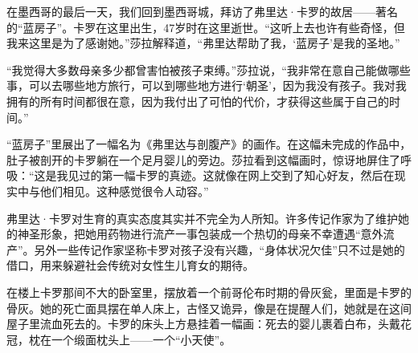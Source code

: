 \documentclass[12pt,oneside]{book}
\begin{document}
\begin{bookref}[frametitle={\cite{好好告别}}]
在墨西哥的最后一天，我们回到墨西哥城，拜访了弗里达·卡罗的故居——著名的“蓝房子”。卡罗在这里出生，47岁时在这里逝世。“这听上去也许有些奇怪，但我来这里是为了感谢她。”莎拉解释道，“弗里达帮助了我，‘蓝房子’是我的圣地。”

“我觉得大多数母亲多少都曾害怕被孩子束缚。”莎拉说，“我非常在意自己能做哪些事，可以去哪些地方旅行，可以到哪些地方进行‘朝圣’，因为我没有孩子。我对我拥有的所有时间都很在意，因为我付出了可怕的代价，才获得这些属于自己的时间。”

“蓝房子”里展出了一幅名为《弗里达与剖腹产》的画作。在这幅未完成的作品中，肚子被剖开的卡罗躺在一个足月婴儿的旁边。莎拉看到这幅画时，惊讶地屏住了呼吸：“这是我见过的第一幅卡罗的真迹。这就像在网上交到了知心好友，然后在现实中与他们相见。这种感觉很令人动容。”

弗里达·卡罗对生育的真实态度其实并不完全为人所知。许多传记作家为了维护她的神圣形象，把她用药物进行流产一事包装成一个热切的母亲不幸遭遇“意外流产”。另外一些传记作家坚称卡罗对孩子没有兴趣，“身体状况欠佳”只不过是她的借口，用来躲避社会传统对女性生儿育女的期待。

在楼上卡罗那间不大的卧室里，摆放着一个前哥伦布时期的骨灰瓮，里面是卡罗的骨灰。她的死亡面具摆在单人床上，古怪又诡异，像是在提醒人们，她就是在这间屋子里流血死去的。卡罗的床头上方悬挂着一幅画：死去的婴儿裹着白布，头戴花冠，枕在一个缎面枕头上——一个“小天使”。

\end{bookref}
\end{document}
